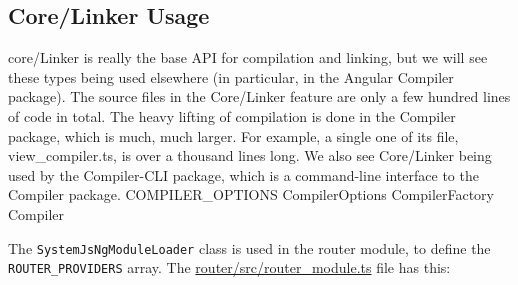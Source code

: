\subsection{Core/Linker Usage}

core/Linker is really the base API for compilation and linking, but we will see these
types being used elsewhere (in particular, in the Angular Compiler package). The
source files in the Core/Linker feature are only a few hundred lines of code in total.
The heavy lifting of compilation is done in the Compiler package, which is much, much
larger. For example, a single one of its file, view\_compiler.ts, is over a thousand lines
long. We also see Core/Linker being used by the Compiler-CLI package, which is a
command-line interface to the Compiler package.
COMPILER\_OPTIONS
CompilerOptions
CompilerFactory
Compiler

The
\texttt{SystemJsNgModuleLoader}
class is used in the router module, to define the
\texttt{ROUTER\_PROVIDERS}
array. The
\url{router/src/router_module.ts}
file has this:


